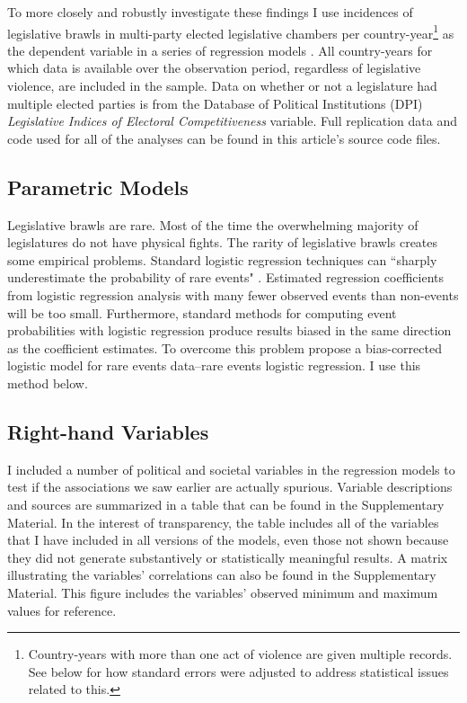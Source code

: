 \documentclass[a4paper]{article}\usepackage[]{graphicx}\usepackage[]{color}
\begin{document}
To more closely and robustly investigate these findings I use incidences of legislative brawls in multi-party elected legislative chambers per country-year\footnote{Country-years with more than one act of violence are given multiple records. See below for how standard errors were adjusted to address statistical issues related to this.} as the dependent variable in a series of regression models \citep{KingRareEvents2001, KingRareEventsPA2001}. All country-years for which data is available over the observation period, regardless of legislative violence, are included in the sample. Data on whether or not a legislature had multiple elected parties is from the Database of Political Institutions (DPI) \citep[updated to 2010]{DPI2001} {\emph{Legislative Indices of Electoral Competitiveness}} variable. Full replication data and code used for all of the analyses can be found in this article's source code files.

\subsection{Parametric Models}

Legislative brawls are rare. Most of the time the overwhelming majority of legislatures do not have physical fights. The rarity of legislative brawls creates some empirical problems. Standard logistic regression techniques can ``sharply underestimate the probability of rare events" \cite[137]{KingRareEventsPA2001}. Estimated regression coefficients from logistic regression analysis with many fewer observed events than non-events will be too small. Furthermore, standard methods for computing event probabilities with logistic regression produce results biased in the same direction as the coefficient estimates. To overcome this problem \cite{KingRareEvents2001,KingRareEventsPA2001} propose a bias-corrected logistic model for rare events data--rare events logistic regression. I use this method below.

\subsection{Right-hand Variables}

I included a number of political and societal variables in the regression models to test if the associations we saw earlier are actually spurious. Variable descriptions and sources are summarized in a table that can be found in the Supplementary Material. In the interest of transparency, the table includes all of the variables that I have included in all versions of the models, even those not shown because they did not generate substantively or statistically meaningful results. A matrix illustrating the variables' correlations can also be found in the Supplementary Material. This figure includes the variables' observed minimum and maximum values for reference.
\end{document}
